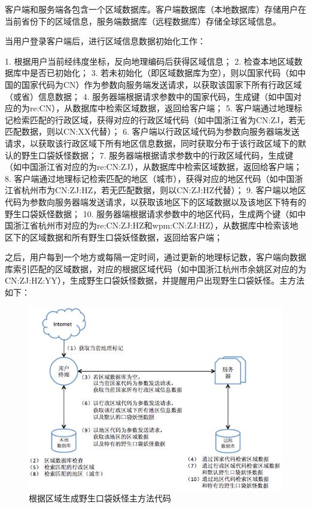 \documentclass{article}
\begin{document}
\begin{CJK}{UTF8}{gbsn}
  客户端和服务端各包含一个区域数据库。客户端数据库（本地数据库）存储用户在当前省份下的区域信息，服务端数据库（远程数据库）存储全球区域信息。
  
  当用户登录客户端后，进行区域信息数据初始化工作： 
  
  1. 根据用户当前经纬度坐标，反向地理编码后获得区域信息；
  2. 检查本地区域数据库中是否已初始化；
  3. 若未初始化（即区域数据库为空），则以国家代码\cite{N05}（如中国的国家代码为CN）作为参数向服务端发送请求，以获取该国家下所有行政区域（或省）信息数据；
  4. 服务器端根据请求参数中的国家代码，生成键（如中国对应的为re:CN），从数据库中检索区域数据，返回给客户端；
  5. 客户端通过地理标记检索匹配的行政区域，获得对应的行政区域代码（如中国浙江省为CN:ZJ，若无匹配数据，则以CN:XX代替）；
  6. 客户端以行政区域代码为参数向服务器端发送请求，以获取该行政区域下所有地区信息数据，同时获取分布于该行政区域下的默认的野生口袋妖怪数据；
  7. 服务器端根据请求参数中的行政区域代码，生成键（如中国浙江省对应的为re:CN:ZJ），从数据库中检索区域数据，返回给客户端；
  8. 客户端通过地理标记检索匹配的地区（城市），获得对应的地区代码（如中国浙江省杭州市为CN:ZJ:HZ，若无匹配数据，则以CN:ZJ:HZ代替）；
  9. 客户端以地区代码为参数向服务器端发送请求，以获取该地区下的区域数据以及该地区下特有的野生口袋妖怪数据；
  10. 服务器端根据请求参数中的地区代码，生成两个键（如中国浙江省杭州市对应的为re:CN:ZJ:HZ和wpm:CN:ZJ:HZ），从数据库中检索该地区下的区域数据和所有野生口袋妖怪数据，返回给客户端；
  
  之后，用户每到一个地方或每隔一定时间，通过更新的地理标记数，客户端向数据库索引匹配的区域数据，对应的根据区域代码（如中国浙江杭州市余姚区对应的为CN:ZJ:HZ:YY），生成野生口袋妖怪数据，并提醒用户出现野生口袋妖怪。主方法如下：

   \begin{figure}[htbp]
		\centering
		\includegraphics[bb=0 0 749 669, scale=0.45]{figure/fig_n19.png}
		\caption{根据区域生成野生口袋妖怪主方法代码}
		\label{fig:n19}
	\end{figure}


\end{CJK}
\end{document}
